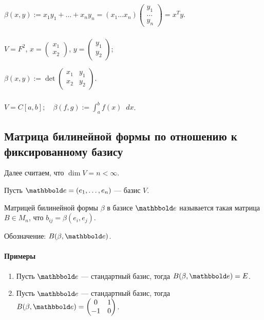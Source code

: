 $\beta(x, y) := x_1 y_1 + \dots + x_n y_n = (x_1 \dots x_n) \begin{pmatrix} y_1 \\ \dots \\ y_n \end{pmatrix} = x^{T} y$.

\subsubsection{}

$V = F^2$, $x = \begin{pmatrix} x_1 \\ x_2 \end{pmatrix}$, $y = \begin{pmatrix} y_1 \\ y_2 \end{pmatrix}$;

$\beta(x, y) := \det \begin{pmatrix} x_1 & y_1 \\ x_2 & y_2 \end{pmatrix}$.

\subsubsection{}

$V = C[a, b]; \quad \beta(f, g) := \displaystyle\int^b_a f(x) \mathop{}\!d x$.


\subsection{Матрица билинейной формы по отношению к фиксированному базису}

Далее считаем, что $\dim V = n < \infty$.

Пусть $\E = (e_1, \dots, e_n)$ --- базис $V$.

\begin{definition}
    Матрицей билинейной формы $\beta$ в базисе $\E$ называется такая матрица $B \in M_n$, что $b_{ij} = \beta(e_i, e_j)$.

    Обозначение: $B(\beta, \E)$.
\end{definition}

\paragraph{Примеры}
\begin{enumerate}
\item Пусть $\E$ --- стандартный базис, тогда $B(\beta, \E) = E$.
\item Пусть $\E$ --- стандартный базис, тогда $B(\beta, \E) = \begin{pmatrix} 0 & 1 \\ -1 & 0 \end{pmatrix}$.
\end{enumerate}

